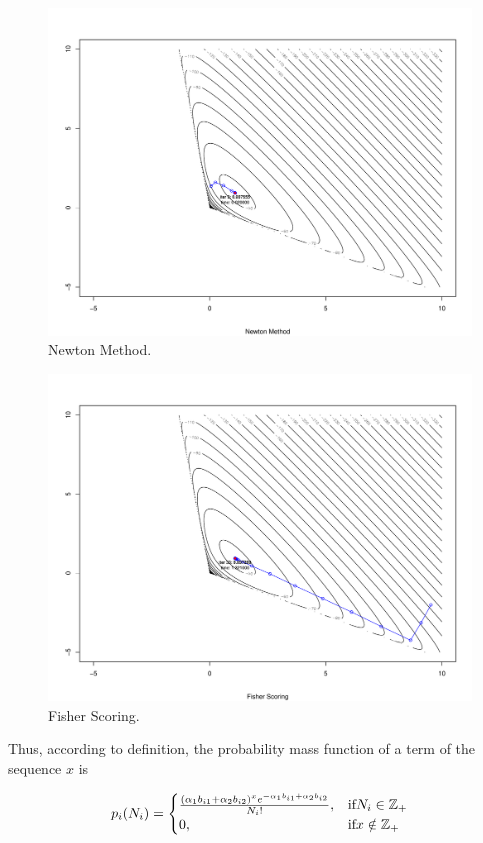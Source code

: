 \begin{figure}[h!]
\includegraphics[scale=0.3]{figs/newton.pdf}
\caption{Newton Method.}
\label{img:newton}
\end{figure}

\begin{figure}[h!]
\includegraphics[scale=0.3]{figs/fisher.pdf}
\caption{Fisher Scoring.}
\label{img:fisher}
\end{figure}

Thus, according to definition, the probability mass function of a term of the sequence $x$ is 

$$p_i(N_i)=
\begin{cases}
\frac{(\alpha_1 b_{i1} + \alpha_2 b_{i2})^x e^{-\alpha_1 b_{i1} + \alpha_2 b_{i2}}}{N_i!},  & \text{if} N_i \in \Bbb Z_{+}\\
0,  & \text{if} x \notin \Bbb Z_{+}
\end{cases}
$$

